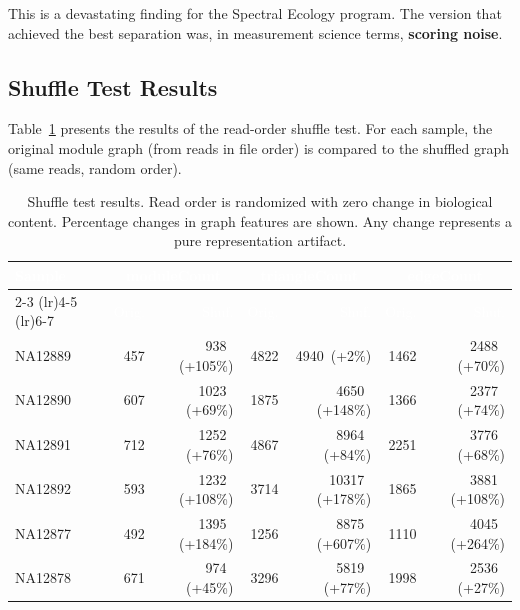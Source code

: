 \documentclass{../yalumba}
\begin{document}
This is a devastating finding for the Spectral Ecology program.  The
version that achieved the best separation was, in measurement science
terms, \textbf{scoring noise}.

\subsection{Shuffle Test Results}
\label{sec:shuffle}

Table~\ref{tab:shuffle} presents the results of the read-order shuffle
test.  For each sample, the original module graph (from reads in file
order) is compared to the shuffled graph (same reads, random order).

\begin{table}[htbp]
\centering
\tablestyle
\caption{Shuffle test results.  Read order is randomized with zero change
in biological content.  Percentage changes in graph features are shown.
Any change represents a pure representation artifact.}
\label{tab:shuffle}
\begin{tabular}{@{}l rr rr rr@{}}
\toprule
\rowcolor{table-header}
\textcolor{white}{\textbf{Sample}} &
\multicolumn{2}{c}{\textcolor{white}{\textbf{moduleCount}}} &
\multicolumn{2}{c}{\textcolor{white}{\textbf{triangleCount}}} &
\multicolumn{2}{c}{\textcolor{white}{\textbf{edgeCount}}} \\
\cmidrule(lr){2-3} \cmidrule(lr){4-5} \cmidrule(lr){6-7}
\rowcolor{table-header}
& \textcolor{white}{Orig.} & \textcolor{white}{Shuf.}
& \textcolor{white}{Orig.} & \textcolor{white}{Shuf.}
& \textcolor{white}{Orig.} & \textcolor{white}{Shuf.} \\
\midrule
NA12889 & 457  & 938 \,\textcolor{yalumba-wine}{(+105\%)}
        & 4822 & 4940 \,\textcolor{yalumba-wine}{(+2\%)}
        & 1462 & 2488 \,\textcolor{yalumba-wine}{(+70\%)} \\
NA12890 & 607  & 1023 \,\textcolor{yalumba-wine}{(+69\%)}
        & 1875 & 4650 \,\textcolor{yalumba-wine}{(+148\%)}
        & 1366 & 2377 \,\textcolor{yalumba-wine}{(+74\%)} \\
NA12891 & 712  & 1252 \,\textcolor{yalumba-wine}{(+76\%)}
        & 4867 & 8964 \,\textcolor{yalumba-wine}{(+84\%)}
        & 2251 & 3776 \,\textcolor{yalumba-wine}{(+68\%)} \\
NA12892 & 593  & 1232 \,\textcolor{yalumba-wine}{(+108\%)}
        & 3714 & 10317 \,\textcolor{yalumba-wine}{(+178\%)}
        & 1865 & 3881 \,\textcolor{yalumba-wine}{(+108\%)} \\
NA12877 & 492  & 1395 \,\textcolor{yalumba-wine}{(+184\%)}
        & 1256 & 8875 \,\textcolor{yalumba-wine}{(+607\%)}
        & 1110 & 4045 \,\textcolor{yalumba-wine}{(+264\%)} \\
NA12878 & 671  & 974 \,\textcolor{yalumba-wine}{(+45\%)}
        & 3296 & 5819 \,\textcolor{yalumba-wine}{(+77\%)}
        & 1998 & 2536 \,\textcolor{yalumba-wine}{(+27\%)} \\
\bottomrule
\end{tabular}
\end{table}
\end{document}
